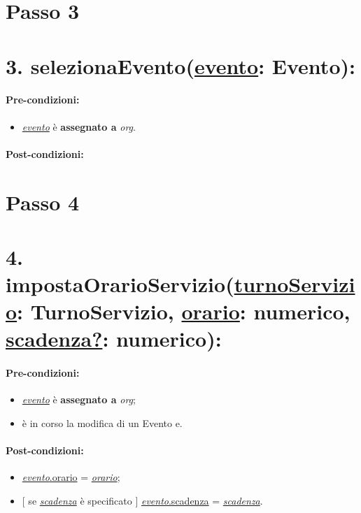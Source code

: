 
\section{Passo 3}
\section*{3. selezionaEvento(\underline{evento}: Evento):}

\paragraph{Pre-condizioni:}
\begin{itemize}
     \item \underline{\textit{evento}} è \textbf{assegnato a} {\textit{org}}.
\end{itemize}

\paragraph{Post-condizioni:}

\section{Passo 4}
\section*{4. impostaOrarioServizio(\underline{turnoServizio}: TurnoServizio, \underline{orario}: numerico, \underline{scadenza?}: numerico):}

\paragraph{Pre-condizioni:}
\begin{itemize}
    \item \underline{\textit{evento}} è \textbf{assegnato a} {\textit{org}};
    \item è in corso la modifica di un Evento e.
\end{itemize}

\paragraph{Post-condizioni:}
 \begin{itemize}
    \item\underline{\textit{evento}.orario} = \underline{\textit{orario}};

    \item $[$ se \underline{\textit{scadenza}} è specificato $]$ \underline{\textit{evento}.scadenza} = \underline{\textit{scadenza}}.
\end{itemize}

